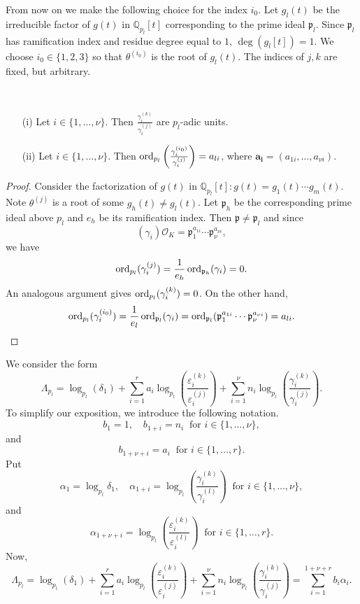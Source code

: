 From now on we make the following choice for the index $i_0$. Let $g_l(t)$ be the irreducible factor of $g(t)$ in $\mathbb{Q}_{p_l}[t]$ corresponding to the prime ideal $\mathfrak{p}_l$. Since $\mathfrak{p}_l$ has ramification index and residue degree equal to $1$, $\deg(g_l[t]) = 1$. We choose $i_0 \in \{1,2,3\}$ so that $\theta^{(i_0)}$ is the root of $g_l(t)$. The indices of $j,k$ are fixed, but arbitrary. 

\begin{lemma} \label{Lem:units} \
\begin{enumerate}
\item[(i)] Let $i \in \{1, \dots, \nu\}$. Then $\frac{\gamma_i^{(k)}}{\gamma_i^{(j)}}$ are $p_l$-adic units. 
\item[(ii)] Let $i \in \{1, \dots, \nu\}$. Then $\operatorname{ord}_{p_l}\left(\frac{\gamma_i^{(i_0)}}{\gamma_i^{(j)}}\right) = a_{li}$, where $\mathbf{a_i} = (a_{1i}, \dots, a_{\nu i})$. 
\end{enumerate}
\end{lemma}

\begin{proof}
Consider the factorization of $g(t)$ in $\mathbb{Q}_{p_l}[t]: g(t) = g_1(t) \cdots g_m(t)$. Note $\theta^{(j)}$ is a root of some $g_h(t) \neq g_l(t)$. Let $\mathfrak{p}_h$ be the corresponding prime ideal above $p_l$ and $e_h$ be its ramification index. Then $\mathfrak{p} \neq \mathfrak{p}_l$ and since 
\[(\gamma_i)\mathcal{O}_K = \mathfrak{p}_1^{a_{1i}} \cdots \mathfrak{p}_{\nu}^{a_{\nu i}},\]
we have 
\[\operatorname{ord}_{p_l}(\gamma_i^{(j)}) = \frac{1}{e_h}\operatorname{ord}_{\mathfrak{p}_h}(\gamma_i) = 0.\]
An analogous argument gives $\operatorname{ord}_{p_l}(\gamma_i^{(k)}) = 0$. On the other hand, 
\[\operatorname{ord}_{p_l}(\gamma_i^{(i_0)}) = \frac{1}{e_l}\operatorname{ord}_{\mathfrak{p}_l}(\gamma_i) = \operatorname{ord}_{\mathfrak{p}_l}(\mathfrak{p}_1^{a_{1i}} \cdots \mathfrak{p}_{\nu}^{a_{\nu i}}) = a_{li}.\]

\end{proof}

We consider the form
\[\Lambda_{p_l} = \log_{p_l}(\delta_1) + \sum_{i=1}^r a_i\log_{p_l}\left( \frac{\varepsilon_i^{(k)}}{\varepsilon_i^{(j)}}\right) + \sum_{i=1}^{\nu} n_i \log_{p_l} \left( \frac{\gamma_i^{(k)}}{\gamma_i^{(j)}}\right).\]
To simplify our exposition, we introduce the following notation. 
\[b_1 = 1, \quad b_{1+i} = n_i \ \text{ for } i \in \{1, \dots, \nu\},\]
and
\[ b_{1 + \nu+i} = a_i \ \text{ for } i \in \{1, \dots, r\}.\]
Put
\[\alpha_1 = \log_{p_l} \delta_1, \quad \alpha_{1+i} = \log_{p_l}\left( \frac{\gamma_i^{(k)}}{\gamma_i^{(l)}}\right)  \ \text{ for } i \in \{1, \dots, \nu\},\]
and
\[\alpha_{1+ \nu+i} = \log_{p_l}\left( \frac{\varepsilon_i^{(k)}}{\varepsilon_i^{(l)}}\right)
\ \text{ for } i \in \{1, \dots, r\}.\]
Now, 
\[\Lambda_{p_l} = \log_{p_l}(\delta_1) + \sum_{i=1}^r a_i\log_{p_l}\left( \frac{\varepsilon_i^{(k)}}{\varepsilon_i^{(j)}}\right) + \sum_{i=1}^{\nu} n_i \log_{p_l} \left( \frac{\gamma_i^{(k)}}{\gamma_i^{(j)}}\right) = \sum_{i = 1}^{1 + \nu + r} b_i\alpha_i.\]


